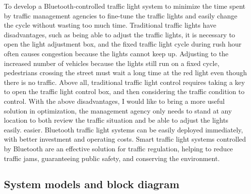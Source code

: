 \documentclass[conference, onecolumn]{IEEEtran}
\begin{document}
To develop a Bluetooth-controlled traffic light system to minimize the time spent by traffic management agencies to fine-tune the traffic lights and easily change the cycle without wasting too much time. Traditional traffic lights have disadvantages, such as being able to adjust the traffic lights, it is necessary to open the light adjustment box, and the fixed traffic light cycle during rush hour often causes congestion because the lights cannot keep up. Adjusting to the increased number of vehicles because the lights still run on a fixed cycle, pedestrians crossing the street must wait a long time at the red light even though there is no traffic. Above all, traditional traffic light control requires taking a key to open the traffic light control box, and then considering the traffic condition to control. With the above disadvantages, I would like to bring a more useful solution in optimization, the management agency only needs to stand at any location to both review the traffic situation and be able to adjust the lights easily. easier. Bluetooth traffic light systems can be easily deployed immediately, with better investment and operating costs. Smart traffic light systems controlled by Bluetooth are an effective solution for traffic regulation, helping to reduce traffic jams, guaranteeing public safety, and conserving the environment.\\


\subsection{System models and block diagram}
\end{document}
